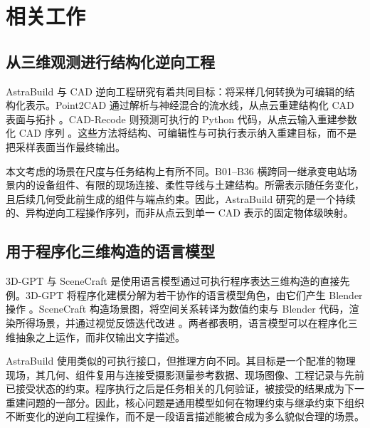 \documentclass[10pt,a4paper]{article}
\begin{document}
\hypertarget{ux76f8ux5173ux5de5ux4f5c}{%
\section{相关工作}\label{ux76f8ux5173ux5de5ux4f5c}}

\hypertarget{ux4eceux4e09ux7ef4ux89c2ux6d4bux8fdbux884cux7ed3ux6784ux5316ux9006ux5411ux5de5ux7a0b}{%
\subsection{从三维观测进行结构化逆向工程}\label{ux4eceux4e09ux7ef4ux89c2ux6d4bux8fdbux884cux7ed3ux6784ux5316ux9006ux5411ux5de5ux7a0b}}

AstraBuild 与 CAD
逆向工程研究有着共同目标：将采样几何转换为可编辑的结构化表示。Point2CAD
通过解析与神经混合的流水线，从点云重建结构化 CAD 表面与拓扑
\citep{liu2024point2cad}。CAD-Recode 则预测可执行的 Python
代码，从点云输入重建参数化 CAD 序列
\citep{rukhovich2024cadrecode}。这些方法将结构、可编辑性与可执行表示纳入重建目标，而不是把采样表面当作最终输出。

本文考虑的场景在尺度与任务结构上有所不同。B01--B36
横跨同一继承变电站场景内的设备组件、有限的现场连接、柔性导线与土建结构。所需表示随任务变化，且后续几何受此前生成的组件与端点约束。因此，AstraBuild
研究的是一个持续的、异构逆向工程操作序列，而非从点云到单一 CAD
表示的固定物体级映射。

\hypertarget{ux7528ux4e8eux7a0bux5e8fux5316ux4e09ux7ef4ux6784ux9020ux7684ux8bedux8a00ux6a21ux578b}{%
\subsection{用于程序化三维构造的语言模型}\label{ux7528ux4e8eux7a0bux5e8fux5316ux4e09ux7ef4ux6784ux9020ux7684ux8bedux8a00ux6a21ux578b}}

3D-GPT 与 SceneCraft
是使用语言模型通过可执行程序表达三维构造的直接先例。3D-GPT
将程序化建模分解为若干协作的语言模型角色，由它们产生 Blender 操作
\citep{sun2023threegpt}。SceneCraft
构造场景图，将空间关系转译为数值约束与 Blender
代码，渲染所得场景，并通过视觉反馈迭代改进
\citep{hu2024scenecraft}。两者都表明，语言模型可以在程序化三维抽象之上运作，而非仅输出文字描述。

AstraBuild
使用类似的可执行接口，但推理方向不同。其目标是一个配准的物理现场，其几何、组件复用与连接受摄影测量参考数据、现场图像、工程记录与先前已接受状态的约束。程序执行之后是任务相关的几何验证，被接受的结果成为下一重建问题的一部分。因此，核心问题是通用模型如何在物理约束与继承约束下组织不断变化的逆向工程操作，而不是一段语言描述能被合成为多么貌似合理的场景。
\end{document}
